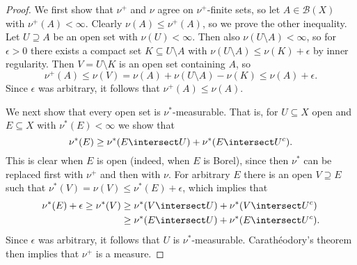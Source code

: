 \documentclass[article, a4paper, 11pt, oneside]{memoir}
\numberwithin{equation}{chapter}
\newcommand{\calB}{\mathcal{B}}
\newcommand{\borel}[1]{\calB(#1)}
\begin{document}
\begin{proof}
    We first show that $\nu^+$ and $\nu$ agree on $\nu^+$-finite sets, so let $A \in \borel{X}$ with $\nu^+(A) < \infty$. Clearly $\nu(A) \leq \nu^+(A)$, so we prove the other inequality. Let $U \supseteq A$ be an open set with $\nu(U) < \infty$. Then also $\nu(U \setminus A) < \infty$, so for $\epsilon > 0$ there exists a compact set $K \subseteq U \setminus A$ with $\nu(U \setminus A) \leq \nu(K) + \epsilon$ by inner regularity. Then $V = U \setminus K$ is an open set containing $A$, so
    \begin{equation*}
        \nu^+(A)
            \leq \nu(V)
            = \nu(A) + \nu(U \setminus A) - \nu(K)
            \leq \nu(A) + \epsilon.
    \end{equation*}
    Since $\epsilon$ was arbitrary, it follows that $\nu^+(A) \leq \nu(A)$.

    We next show that every open set is $\nu^*$-measurable. That is, for $U \subseteq X$ open and $E \subseteq X$ with $\nu^*(E) < \infty$ we show that
    \begin{equation*}
        \nu^*(E)
            \geq \nu^*(E \intersect U) + \nu^*(E \intersect U^c).
    \end{equation*}
    This is clear when $E$ is open (indeed, when $E$ is Borel), since then $\nu^*$ can be replaced first with $\nu^+$ and then with $\nu$. For arbitrary $E$ there is an open $V \supseteq E$ such that $\nu^*(V) = \nu(V) \leq \nu^*(E) + \epsilon$, which implies that
    \begin{align*}
        \nu^*(E) + \epsilon
            \geq \nu^*(V)
            &\geq \nu^*(V \intersect U) + \nu^*(V \intersect U^c) \\
            &\geq \nu^*(E \intersect U) + \nu^*(E \intersect U^c).
    \end{align*}
    Since $\epsilon$ was arbitrary, it follows that $U$ is $\nu^*$-measurable. Carathéodory's theorem then implies that $\nu^+$ is a measure.


\end{proof}
\end{document}
